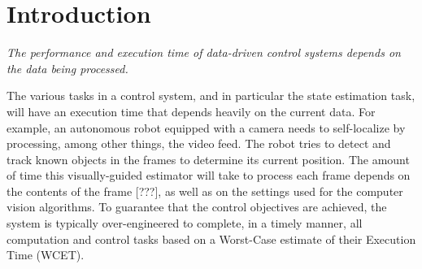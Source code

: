 \section{Introduction}
\label{introduction}

\emph{The performance and execution time of data-driven control systems depends on the data being processed.}

The various tasks in a control system, and in particular the state estimation task, will have an execution time that depends heavily on the current data.
For example, an autonomous robot equipped with a camera needs to self-localize by processing, among other things, the video feed. 
The robot tries to detect and track known objects in the frames to determine its current position.
The amount of time this visually-guided estimator will take to process each frame depends on the contents of the frame [???], as well as on the settings used for the computer vision algorithms.
To guarantee that the control objectives are achieved, the system is typically over-engineered to complete, in a timely manner, all computation and control tasks based on a Worst-Case estimate of their Execution Time (WCET).

